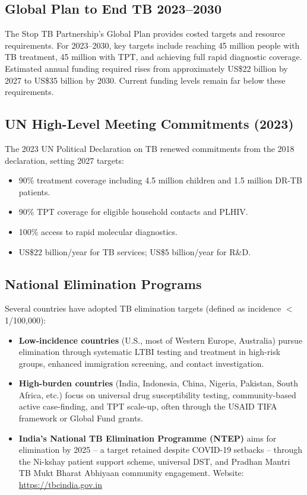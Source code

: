 \documentclass[11pt]{article}
\begin{document}
\subsection{Global Plan to End TB 2023--2030}

The Stop TB Partnership's Global Plan provides costed targets and resource requirements. For 2023--2030, key targets include reaching 45 million people with TB treatment, 45 million with TPT, and achieving full rapid diagnostic coverage. Estimated annual funding required rises from approximately US\$22 billion by 2027 to US\$35 billion by 2030. Current funding levels remain far below these requirements.

\subsection{UN High-Level Meeting Commitments (2023)}

The 2023 UN Political Declaration on TB renewed commitments from the 2018 declaration, setting 2027 targets:
\begin{itemize}
  \item 90\% treatment coverage including 4.5 million children and 1.5 million DR-TB patients.
  \item 90\% TPT coverage for eligible household contacts and PLHIV.
  \item 100\% access to rapid molecular diagnostics.
  \item US\$22 billion/year for TB services; US\$5 billion/year for R\&D.
\end{itemize}

\subsection{National Elimination Programs}

Several countries have adopted TB elimination targets (defined as incidence $<$1/100,000):
\begin{itemize}
  \item \textbf{Low-incidence countries} (U.S., most of Western Europe, Australia) pursue elimination through systematic LTBI testing and treatment in high-risk groups, enhanced immigration screening, and contact investigation.
  \item \textbf{High-burden countries} (India, Indonesia, China, Nigeria, Pakistan, South Africa, etc.) focus on universal drug susceptibility testing, community-based active case-finding, and TPT scale-up, often through the USAID TIFA framework or Global Fund grants.
  \item \textbf{India's National TB Elimination Programme (NTEP)} aims for elimination by 2025 -- a target retained despite COVID-19 setbacks -- through the Ni-kshay patient support scheme, universal DST, and Pradhan Mantri TB Mukt Bharat Abhiyaan community engagement. Website: \url{https://tbcindia.gov.in}
\end{itemize}
\end{document}

